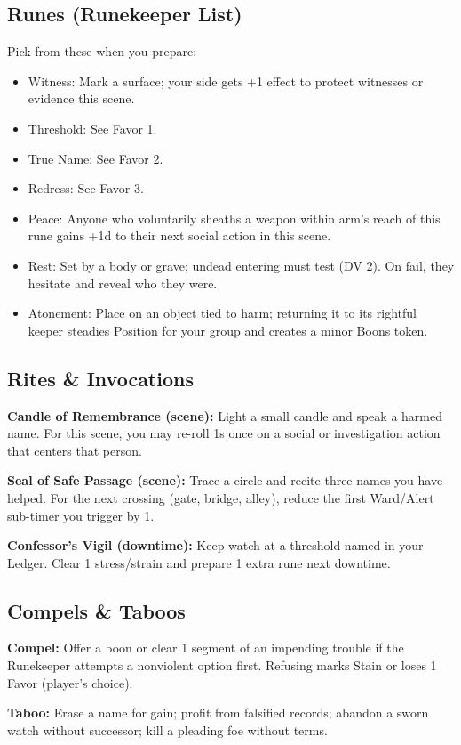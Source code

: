 \documentclass[18pt, letterpaper, twoside]{article}
\newcommand{\rite}[2]{\noindent\textbf{#1:} #2\par}
\newcommand{\compel}[1]{\noindent\textbf{Compel:} #1\par}
\newcommand{\taboo}[1]{\noindent\textbf{Taboo:} #1\par}
\begin{document}
\subsection{Runes (Runekeeper List)}

Pick from these when you prepare:
\begin{itemize}
    \item Witness: Mark a surface; your side gets +1 effect to protect witnesses or evidence this scene.
    \item Threshold: See Favor 1.
    \item True Name: See Favor 2.
    \item Redress: See Favor 3.
    \item Peace: Anyone who voluntarily sheaths a weapon within arm's reach of this rune gains +1d to their next social action in this scene.
    \item Rest: Set by a body or grave; undead entering must test (DV 2). On fail, they hesitate and reveal who they were.
    \item Atonement: Place on an object tied to harm; returning it to its rightful keeper steadies Position for your group and creates a minor Boons token.
\end{itemize}

\subsection{Rites \& Invocations}
\rite{Candle of Remembrance (scene)}{Light a small candle and speak a harmed name. For this scene, you may re-roll 1s once on a social or investigation action that centers that person.}
\rite{Seal of Safe Passage (scene)}{Trace a circle and recite three names you have helped. For the next crossing (gate, bridge, alley), reduce the first Ward/Alert sub-timer you trigger by 1.}
\rite{Confessor's Vigil (downtime)}{Keep watch at a threshold named in your Ledger. Clear 1 stress/strain and prepare 1 extra rune next downtime.}

\subsection{Compels \& Taboos}
\compel{Offer a boon or clear 1 segment of an impending trouble if the Runekeeper attempts a nonviolent option first. Refusing marks Stain or loses 1 Favor (player's choice).}
\taboo{Erase a name for gain; profit from falsified records; abandon a sworn watch without successor; kill a pleading foe without terms.}
\end{document}
